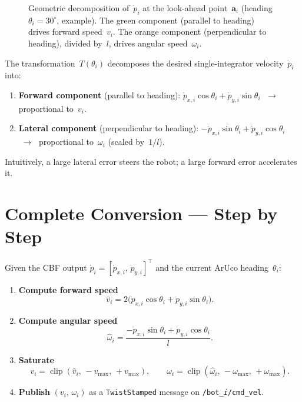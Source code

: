 \documentclass[11pt,a4paper]{article}
\newcommand{\dpdt}[1]{\dot{p}_{#1}}
\newcommand{\dpdx}[1]{\dot{p}_{x,#1}}
\newcommand{\dpdy}[1]{\dot{p}_{y,#1}}
\newcommand{\vmax}{v_{\max}}
\newcommand{\wmax}{\omega_{\max}}
\begin{document}
\begin{figure}[h]
\caption{Geometric decomposition of~$\dpdt{i}$ at the look-ahead
         point~$\mathbf{a}_i$ (heading $\theta_i=30^\circ$, example).
         The \textcolor{green!60!black}{green} component (parallel to heading)
         drives forward speed~$v_i$.
         The \textcolor{orange!80!black}{orange} component (perpendicular to heading),
         divided by~$l$, drives angular speed~$\omega_i$.}
\label{fig:geom}
\end{figure}

The transformation~$T(\theta_i)$ decomposes the desired single-integrator
velocity~$\dpdt{i}$ into:
\begin{enumerate}
  \item \textbf{Forward component} (parallel to heading):
        $\dpdx{i}\cos\theta_i + \dpdy{i}\sin\theta_i$
        $\;\longrightarrow\;$ proportional to~$v_i$.
  \item \textbf{Lateral component} (perpendicular to heading):
        $-\dpdx{i}\sin\theta_i + \dpdy{i}\cos\theta_i$
        $\;\longrightarrow\;$ proportional to~$\omega_i$ (scaled by~$1/l$).
\end{enumerate}
Intuitively, a large lateral error steers the robot; a large forward error
accelerates it.

\section{Complete Conversion — Step by Step}

Given the CBF output $\dpdt{i} = [\dpdx{i},\,\dpdy{i}]^\top$ and the
current ArUco heading~$\theta_i$:

\begin{enumerate}
  \item \textbf{Compute forward speed}
        \[
          \hat v_i = 2\bigl(\dpdx{i}\cos\theta_i + \dpdy{i}\sin\theta_i\bigr).
        \]
  \item \textbf{Compute angular speed}
        \[
          \hat\omega_i = \frac{-\dpdx{i}\sin\theta_i + \dpdy{i}\cos\theta_i}{l}.
        \]
  \item \textbf{Saturate}
        \[
          v_i = \operatorname{clip}(\hat v_i,\,-\vmax,\,+\vmax), \qquad
          \omega_i = \operatorname{clip}(\hat\omega_i,\,-\wmax,\,+\wmax).
        \]
  \item \textbf{Publish} $(v_i,\,\omega_i)$ as a \texttt{TwistStamped}
        message on \texttt{/bot\_\textit{i}/cmd\_vel}.
\end{enumerate}
\end{document}
